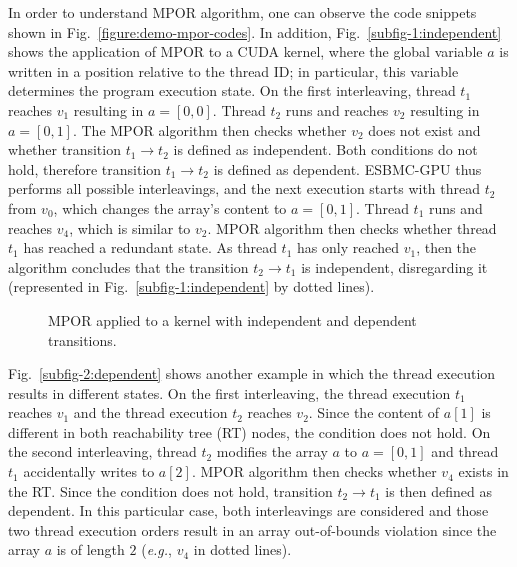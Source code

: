 \documentclass{llncs}
\begin{document}
\begin{enumerate}
\begin{itemize}
\begin{itemize}
	In order to understand MPOR algorithm, one can observe the code snippets shown in Fig.~\ref{figure:demo-mpor-codes}. In addition, Fig.~\ref{subfig-1:independent} shows the application of MPOR to a CUDA kernel, where the global variable $a$ is written in a position relative to the thread ID; in particular, this variable determines the program execution state. On the first interleaving, thread $t_{1}$ reaches $v_1$ resulting in $a=[0,0]$. Thread $t_{2}$ runs and reaches $v_2$ resulting in $a=[0,1]$. The MPOR algorithm then checks whether $v_2$ does not exist and whether transition $t_1 \rightarrow t_2$ is defined as independent. Both conditions do not hold, therefore transition $t_1 \rightarrow t_2$ is defined as dependent. ESBMC-GPU thus performs all possible interleavings, and the next execution starts with thread $t_2$ from $v_0$, which changes the array's content to $a=[0,1]$. Thread $t_1$ runs and reaches $v_4$, which is similar to $v_2$. MPOR algorithm then checks whether thread $t_1$ has reached a redundant state. As thread $t_1$ has only reached $v_1$, then the algorithm concludes that the transition $t_2 \rightarrow t_1$ is independent, disregarding it (represented in Fig.~\ref{subfig-1:independent} by dotted lines).

		\begin{figure}[!]
			\begin{center}
    			\hfill
    			\caption{MPOR applied to a kernel with independent and dependent transitions.}
    			\label{figure:demo-mpor}
		\end{center}
  		\end{figure}
		
Fig.~\ref{subfig-2:dependent} shows another example in which the thread execution results in different states. On the first interleaving, the thread execution $t_1$ reaches $v_1$ and the thread execution $t_2$ reaches $v_2$. Since the content of $a[1]$ is different in both reachability tree (RT) nodes, the condition does not hold. On the second interleaving, thread $t_2$ modifies the array $a$ to $a=[0,1]$ and thread $t_1$ accidentally writes to $a[2]$. MPOR algorithm then checks whether $v_4$ exists in the RT. Since the condition does not hold, transition $t_2 \rightarrow t_1$ is then defined as dependent. In this particular case, both interleavings are considered and those two thread execution orders result in an array out-of-bounds violation since the array $a$ is of length $2$ (\textit{e.g.}, $v_4$ in dotted lines).\\


\end{itemize}
\end{itemize}
\end{enumerate}
\end{document}
